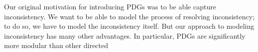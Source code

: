 \documentclass{article}
\theoremstyle{plain}
\theoremstyle{definition}
\theoremstyle{remark}
\numberwithin{equation}{section}
\begin{document}
Our original motivation for introducing PDGs was to be able capture
inconsistency. We want to be
able to model the process of resolving inconsistency; to do so, we have to model
the inconsistency itself. But our approach to modeling inconsistency
has many other advantages. 
In particular, PDGs are significantly more modular than other directed
\end{document}
